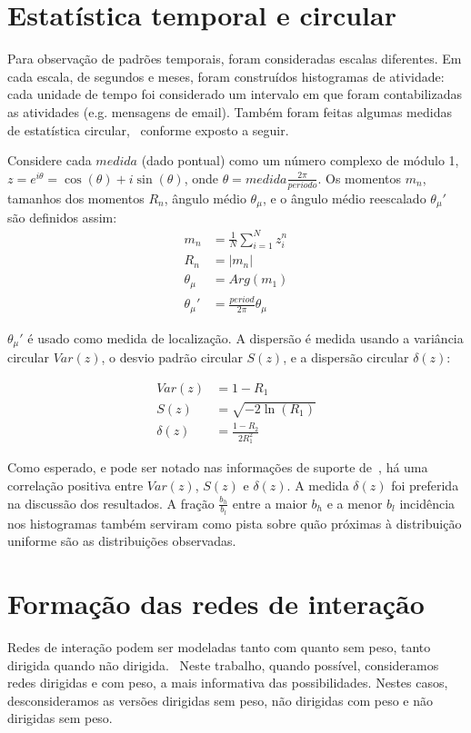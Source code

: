 \documentclass[a4paper,openright,12pt]{report} %
\begin{document}
\section{Estatística temporal e circular}\label{sec:cir}
Para observação de padrões temporais, foram consideradas escalas diferentes.
Em cada escala, de segundos e meses, foram construídos histogramas de atividade: cada unidade de tempo foi considerado um intervalo em que foram contabilizadas as atividades (e.g. mensagens de email).
Também foram feitas algumas medidas de estatística circular,~\cite{wpCirc} conforme exposto a seguir.

Considere cada $ medida $ (dado pontual) como um número complexo de módulo 1, $z=e^{i\theta}=\cos(\theta)+i\sin(\theta)$, onde $\theta= medida \frac{2\pi}{periodo}$. Os momentos $m_n$, tamanhos dos momentos $R_n$, ângulo médio $\theta_\mu$, e o ângulo médio reescalado $\theta_\mu'$ são definidos assim:
\begin{align}\label{eq:cmom}
    m_n&=\frac{1}{N}\sum_{i=1}^N z_i^n \nonumber\\
    R_n&=|m_n|\\
    \theta_\mu&=Arg(m_1) \nonumber \\
    \theta_\mu'&=\frac{period}{2\pi} \theta_\mu \nonumber
\end{align}

$\theta_\mu'$ é usado como medida de localização. A dispersão é medida usando a variância circular $Var(z)$, 
o desvio padrão circular $S(z)$, e a dispersão circular $\delta(z)$:

\begin{align}\label{eq:cmd}
    Var(z)&=1 - R_1 \nonumber\\
    S(z)&= \sqrt{-2\ln(R_1)}\\
    \delta(z)&=\frac{1-R_2}{2 R_1^2} \nonumber
\end{align}

Como esperado, e pode ser notado nas informações de suporte de~\cite{timeS}, há uma correlação positiva entre $Var(z)$, $S(z)$ e $\delta(z)$.
A medida $\delta(z)$ foi preferida na discussão dos resultados.
A fração $\frac{b_h}{b_l}$ entre a maior $b_h $ e a menor $b_l$ incidência nos histogramas
também serviram como pista sobre quão próximas à distribuição uniforme são as distribuições observadas.


\section{Formação das redes de interação}\label{sec:intNet}
Redes de interação podem ser modeladas tanto com quanto sem peso, tanto dirigida quando não dirigida.~\cite{bird,newmanCommunityDirected,newmanCommunity2013,newmanBook}
Neste trabalho, quando possível, consideramos redes dirigidas e com peso, a mais informativa das possibilidades.
Nestes casos, desconsideramos as versões dirigidas sem peso, não dirigidas com peso e não dirigidas sem peso.
\end{document}
